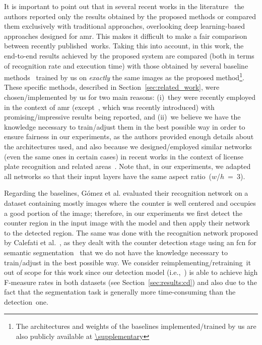 It is important to point out that in several recent works in the literature~\cite{gomez2018cutting,koscevic2018automatic,calefati2019reading,liao2019reading} the authors reported only the results obtained by the proposed methods or compared them exclusively with traditional approaches, overlooking deep learning-based approaches designed for \gls*{amr}.
This makes it difficult to make a fair comparison between recently published~works.
Taking this into account, in this work, the end-to-end results achieved by the proposed system are compared (both in terms of recognition rate and execution time) with those obtained by several baseline methods~\cite{gomez2018cutting,calefati2019reading,liao2019reading,laroca2019convolutional,bochkovskiy2020yolov4} trained by us on \textit{exactly} the same images as the proposed method\footnote{The architectures and weights of the baselines implemented/trained by us are also publicly available at \url{\supplementary}}.
These specific methods, described in Section~\ref{sec:related_work}, were chosen/implemented by us for two main reasons: 
(i)~they were recently employed in the context of \gls*{amr} (except~\cite{bochkovskiy2020yolov4}, which was recently introduced) with promising/impressive results being reported, and (ii)~we believe we have the knowledge necessary to train/adjust them in the best possible way in order to ensure fairness in our experiments, as the authors provided enough details about the  architectures used, and also because we designed/employed similar networks (even the same ones in certain cases) in recent works in the context of license plate recognition and related areas~\cite{goncalves2018realtime,goncalves2019multitask,laroca2021efficient}.
Note that, in our experiments, we adapted all networks so that their input layers have the same aspect ratio~($w$/$h$~=~$3$).

Regarding the baselines, Gómez et al.\cite{gomez2018cutting} evaluated their recognition network on a dataset containing mostly images where the counter is well centered and occupies a good portion of the image; therefore, in our experiments we first detect the counter region in the input image with the \detnet model and then apply their network to the detected region.
The same was done with the recognition network proposed by Calefati et al.~\cite{calefati2019reading}, as they dealt with the counter detection stage using an \gls*{fcn} for semantic segmentation~\cite{long2015fully} that we do not have the knowledge necessary to train/adjust in the best possible way.
We consider reimplementing/retraining~it out of scope for this work since our detection model (i.e.,~\detnet) is able to achieve high F-measure rates in both datasets (see Section~\ref{sec:results:cd}) and also due to the fact that the segmentation task is generally more time-consuming than the detection~one.


